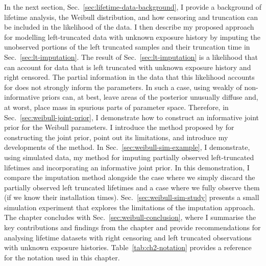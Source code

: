 
In the next section, Sec.~\ref{sec:lifetime-data-background}, I provide a background of lifetime analysis, the Weibull distribution, and how censoring and truncation can be included in the likelihood of the data. I then describe my proposed approach for modelling left-truncated data with unknown exposure history by imputing the unobserved portions of the left truncated samples and their truncation time in Sec.~\ref{sec:lt-imputation}. The result of Sec.~\ref{sec:lt-imputation} is a likelihood that can account for data that is left truncated with unknown exposure history and right censored. The partial information in the data that this likelihood accounts for does not strongly inform the parameters. In such a case, using weakly of non-informative priors can, at best, leave areas of the posterior unusually diffuse and, at worst, place mass in spurious parts of parameter space. Therefore, in Sec.~\ref{sec:weibull-joint-prior}, I demonstrate how to construct an informative joint prior for the Weibull parameters. I introduce the method proposed by \citet{kaminskiy2005} for constructing the joint prior, point out its limitations, and introduce my developments of the method. In Sec.~\ref{sec:weibull-sim-example}, I demonstrate, using simulated data, my method for imputing partially observed left-truncated lifetimes and incorporating an informative joint prior. In this demonstration, I compare the imputation method alongside the case where we simply discard the partially observed left truncated lifetimes and a case where we fully observe them (if we know their installation times). Sec.~\ref{sec:weibull-sim-study} presents a small simulation experiment that explores the limitations of the imputation approach. The chapter concludes with Sec.~\ref{sec:weibull-conclusion}, where I summarise the key contributions and findings from the chapter and provide recommendations for analysing lifetime datasets with right censoring and left truncated observations with unknown exposure histories. Table~\ref{tab:ch2-notation} provides a reference for the notation used in this chapter.

